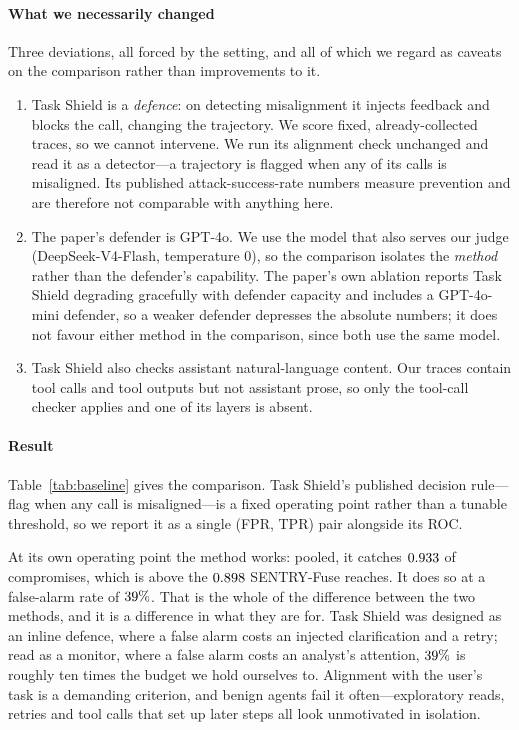 \documentclass[preprint,12pt,number]{elsarticle}
\theoremstyle{definition}
\begin{document}
\paragraph{What we necessarily changed} Three deviations, all forced by the
setting, and all of which we regard as caveats on the comparison rather than
improvements to it.
\begin{enumerate}
\item Task Shield is a \emph{defence}: on detecting misalignment it injects
feedback and blocks the call, changing the trajectory. We score fixed,
already-collected traces, so we cannot intervene. We run its alignment check
unchanged and read it as a detector---a trajectory is flagged when any of its
calls is misaligned. Its published attack-success-rate numbers measure prevention
and are therefore not comparable with anything here.
\item The paper's defender is GPT-4o. We use the model that also serves our judge
(DeepSeek-V4-Flash, temperature $0$), so the comparison isolates the \emph{method}
rather than the defender's capability. The paper's own ablation reports Task Shield
degrading gracefully with defender capacity and includes a GPT-4o-mini defender, so
a weaker defender depresses the absolute numbers; it does not favour either method
in the comparison, since both use the same model.
\item Task Shield also checks assistant natural-language content. Our traces
contain tool calls and tool outputs but not assistant prose, so only the tool-call
checker applies and one of its layers is absent.
\end{enumerate}

\paragraph{Result} Table~\ref{tab:baseline} gives the comparison. Task Shield's
published decision rule---flag when any call is misaligned---is a fixed operating
point rather than a tunable threshold, so we report it as a single (FPR, TPR) pair
alongside its ROC.

At its own operating point the method works: pooled, it catches $0.933$ of
compromises, which is above the $0.898$ SENTRY-Fuse reaches. It does so at a
false-alarm rate of $39\%$. That is the whole of the difference
between the two methods, and it is a difference in what they are for. Task Shield
was designed as an inline defence, where a false alarm costs an injected
clarification and a retry; read as a monitor, where a false alarm costs an analyst's
attention, $39\%$ is roughly ten times the budget we hold ourselves
to. Alignment with the user's task is a demanding criterion, and benign agents fail
it often---exploratory reads, retries and tool calls that set up later steps all
look unmotivated in isolation.
\end{document}
